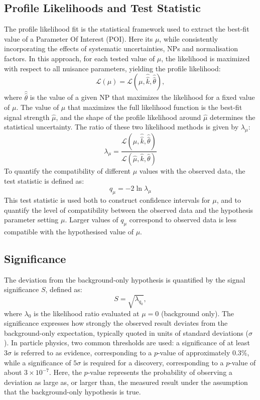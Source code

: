 \subsection{Profile Likelihoods and Test Statistic}
The profile likelihood fit is the statistical framework used to extract the best-fit value of a Parameter Of Interest (POI). Here its $\mu$, while consistently incorporating the effects of systematic uncertainties, NPs and normalisation factors. In this approach, for each tested value of $\mu$, the likelihood is maximized with respect to all nuisance parameters, yielding the profile likelihood:
\begin{equation}
    \mathcal{L}(\mu) = \mathcal{L}(\mu,\hat{\hat{k}}, \hat{\hat{\theta}}),
\end{equation} 
where $\hat{\hat{\theta}}$ is the value of a given NP that maximizes the likelihood for a fixed value of $\mu$. The value of $\mu$ that maximizes the full likelihood function is the best-fit signal strength $\hat{\mu}$, and the shape of the profile likelihood around $\hat{\mu}$ determines the statistical uncertainty. The ratio of these two likelihood methods is given by $\lambda_\mu$:\begin{equation}
    \lambda_\mu = \frac{\mathcal{L}(\mu,\hat{\hat{k}}, \hat{\hat{\theta}})}{\mathcal{L}(\hat{\mu},{\hat{k}}, {\hat{\theta}})}
\end{equation} 
To quantify the compatibility of different $\mu$ values with the observed data, the test statistic is defined as:\begin{equation}
    q_{\mu} = -2 \ln \lambda_\mu
\end{equation}
This test statistic is used both to construct confidence intervals for $\mu$, and to quantify the level of compatibility between the observed data and the hypothesis parameter setting $\mu$. Larger values of $q_\mu$ correspond to observed data is less compatible with the hypothesised value of $\mu$.
\subsection{Significance}
The deviation from the background-only hypothesis is quantified by the signal significance $S$, defined as:  
\begin{equation}
S = \sqrt{\lambda_{q_0}},
\end{equation}
where $\lambda_0$ is the likelihood ratio evaluated at $\mu=0$ (background only). The significance expresses how strongly the observed result deviates from the background-only expectation, typically quoted in units of standard deviations ($\sigma$). In particle physics, two common thresholds are used: a significance of at least $3\sigma$ is referred to as evidence, corresponding to a $p$-value of approximately $0.3\%$, while a significance of $5\sigma$ is required for a discovery, corresponding to a $p$-value of about $3\times10^{-7}$. Here, the $p$-value represents the probability of observing a deviation as large as, or larger than, the measured result under the assumption that the background-only hypothesis is true.

